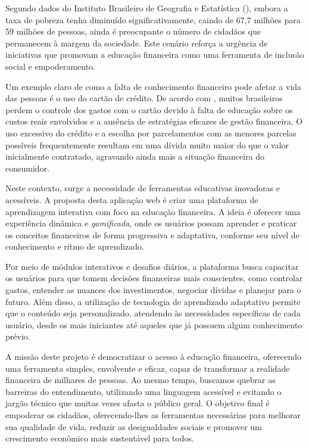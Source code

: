 \documentclass[
	article,			%
	12pt,				%
	oneside,			%
	a4paper,			%
	english,			%
	brazil,				%
	sumario=tradicional
	]{abntex2}
\begin{document}
Segundo dados do Instituto Brasileiro de Geografia e Estatística (), embora a taxa de pobreza tenha diminuído significativamente, caindo de 67,7 milhões para 59 milhões de pessoas, ainda é preocupante o número de cidadãos que permanecem à margem da sociedade. Este cenário reforça a urgência de iniciativas que promovam a educação financeira como uma ferramenta de inclusão social e empoderamento.

Um exemplo claro de como a falta de conhecimento financeiro pode afetar a vida das pessoas é o uso do cartão de crédito. De acordo com , muitos brasileiros perdem o controle dos gastos com o cartão devido à falta de educação sobre os custos reais envolvidos e a ausência de estratégias eficazes de gestão financeira. O uso excessivo do crédito e a escolha por parcelamentos com as menores parcelas possíveis frequentemente resultam em uma dívida muito maior do que o valor inicialmente contratado, agravando ainda mais a situação financeira do consumidor.

Neste contexto, surge a necessidade de ferramentas educativas inovadoras e acessíveis. A proposta desta aplicação web é criar uma plataforma de aprendizagem interativa com foco na educação financeira. A ideia é oferecer uma experiência dinâmica e \textit{gamificada}, onde os usuários possam aprender e praticar os conceitos financeiros de forma progressiva e adaptativa, conforme seu nível de conhecimento e ritmo de aprendizado. 

Por meio de módulos interativos e desafios diários, a plataforma busca capacitar os usuários para que tomem decisões financeiras mais conscientes, como controlar gastos, entender as nuances dos investimentos, negociar dívidas e planejar para o futuro. Além disso, a utilização de tecnologia de aprendizado adaptativo permite que o conteúdo seja personalizado, atendendo às necessidades específicas de cada usuário, desde os mais iniciantes até aqueles que já possuem algum conhecimento prévio.

A missão deste projeto é democratizar o acesso à educação financeira, oferecendo uma ferramenta simples, envolvente e eficaz, capaz de transformar a realidade financeira de milhares de pessoas. Ao mesmo tempo, buscamos quebrar as barreiras do entendimento, utilizando uma linguagem acessível e evitando o jargão técnico que muitas vezes afasta o público geral. O objetivo final é empoderar os cidadãos, oferecendo-lhes as ferramentas necessárias para melhorar sua qualidade de vida, reduzir as desigualdades sociais e promover um crescimento econômico mais sustentável para todos.
\end{document}
